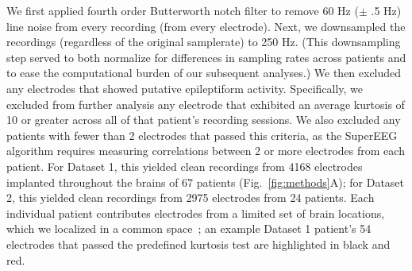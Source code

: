 \documentclass[11pt]{article}
\begin{document}
We first applied fourth order Butterworth notch filter to remove 60 Hz
($\pm$ .5 Hz) line noise from every recording (from every electrode).
Next, we downsampled the recordings (regardless of the original
samplerate) to 250 Hz.  (This downsampling step served to both
normalize for differences in sampling rates across patients and to
ease the computational burden of our subsequent analyses.)  We then
excluded any electrodes that showed putative epileptiform activity.
Specifically, we excluded from further analysis any electrode that
exhibited an average kurtosis of 10 or greater across all of that
patient's recording sessions.  We also excluded any patients with
fewer than 2 electrodes that passed this criteria, as the SuperEEG
algorithm requires measuring correlations between 2 or more electrodes
from each patient.  For Dataset 1, this yielded clean recordings from
4168 electrodes implanted throughout the brains of 67 patients
(Fig.~\ref{fig:methods}A); for Dataset 2, this yielded clean
recordings from 2975 electrodes from 24 patients.  Each individual
patient contributes electrodes from a limited set of brain locations,
which we localized in a common space~\citep[MNI152;][]{GrabEtal06}; an
example Dataset 1 patient's 54 electrodes that passed the predefined
kurtosis test are highlighted in black and red.
\end{document}

